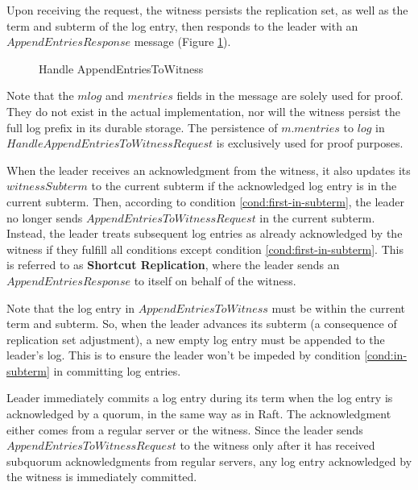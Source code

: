 Upon receiving the request, the witness persists the replication set, as well as the term and subterm of the log entry, then responds to the leader with an $AppendEntriesResponse$ message (Figure \ref{fig:handle-append-entries-to-witness}). 

\begin{figure}
    \begin{framed}
        
    \end{framed}
    \caption{Handle AppendEntriesToWitness}
    \label{fig:handle-append-entries-to-witness}
\end{figure}

Note that the $mlog$ and $mentries$ fields in the message are solely used for proof. They do not exist in the actual implementation, nor will the witness persist the full log prefix in its durable storage. The persistence of $m.mentries$ to $log$ in $HandleAppendEntriesToWitnessRequest$ is exclusively used for proof purposes.

When the leader receives an acknowledgment from the witness, it also updates its $witnessSubterm$ to the current subterm if the acknowledged log entry is in the current subterm. Then, according to condition \ref{cond:first-in-subterm}, the leader no longer sends $AppendEntriesToWitnessRequest$ in the current subterm. Instead, the leader treats subsequent log entries as already acknowledged by the witness if they fulfill all conditions except condition \ref{cond:first-in-subterm}. This is referred to as \textbf{Shortcut Replication}, where the leader sends an $AppendEntriesResponse$ to itself on behalf of the witness.

Note that the log entry in $AppendEntriesToWitness$ must be within the current term and subterm. So, when the leader advances its subterm (a consequence of replication set adjustment), a new empty log entry must be appended to the leader's log. This is to ensure the leader won't be impeded by condition \ref{cond:in-subterm} in committing log entries.

Leader immediately commits a log entry during its term when the log entry is acknowledged by a quorum, in the same way as in Raft. The acknowledgment either comes from a regular server or the witness. Since the leader sends $AppendEntriesToWitnessRequest$ to the witness only after it has received subquorum acknowledgments from regular servers, any log entry acknowledged by the witness is immediately committed.

